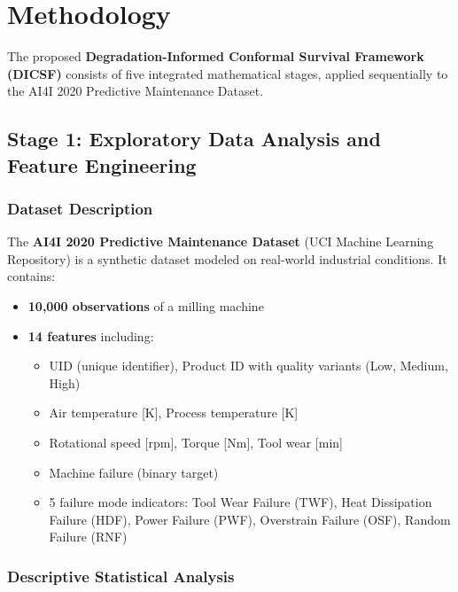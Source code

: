 \documentclass[12pt, a4paper]{article}
\begin{document}
\section{Methodology}

The proposed \textbf{Degradation-Informed Conformal Survival Framework (DICSF)} consists of five integrated mathematical stages, applied sequentially to the AI4I 2020 Predictive Maintenance Dataset.

\subsection{Stage 1: Exploratory Data Analysis and Feature Engineering}

\subsubsection{Dataset Description}

The \textbf{AI4I 2020 Predictive Maintenance Dataset} (UCI Machine Learning Repository) \citep{matzka2020} is a synthetic dataset modeled on real-world industrial conditions. It contains:

\begin{itemize}[leftmargin=*]
    \item \textbf{10,000 observations} of a milling machine
    \item \textbf{14 features} including:
    \begin{itemize}
        \item UID (unique identifier), Product ID with quality variants (Low, Medium, High)
        \item Air temperature [K], Process temperature [K]
        \item Rotational speed [rpm], Torque [Nm], Tool wear [min]
        \item Machine failure (binary target)
        \item 5 failure mode indicators: Tool Wear Failure (TWF), Heat Dissipation Failure (HDF), Power Failure (PWF), Overstrain Failure (OSF), Random Failure (RNF)
    \end{itemize}
\end{itemize}

\subsubsection{Descriptive Statistical Analysis}
\end{document}
